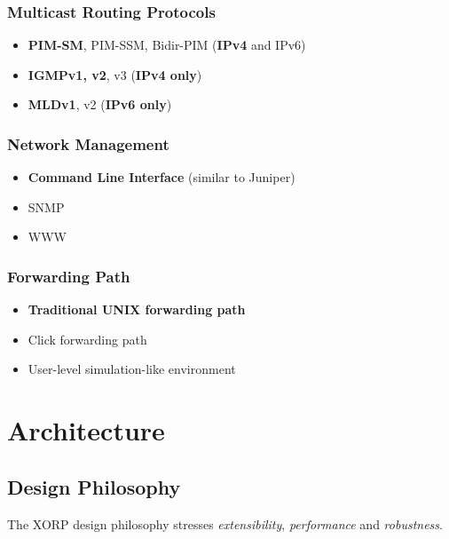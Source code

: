 \documentclass[11pt]{article}
\begin{document}
\subsubsection*{Multicast Routing Protocols}

\begin{itemize}
  \item {\bf PIM-SM}, PIM-SSM, Bidir-PIM ({\bf IPv4} and IPv6)
  \item {\bf IGMPv1, v2}, v3 ({\bf IPv4 only})
  \item {\bf MLDv1}, v2 ({\bf IPv6 only})
\end{itemize}

\subsubsection*{Network Management}

\begin{itemize}
  \item {\bf Command Line Interface} (similar to Juniper)
  \item SNMP
  \item WWW
\end{itemize}

\subsubsection*{Forwarding Path}

\begin{itemize}
  \item {\bf Traditional UNIX forwarding path}
  \item Click forwarding path
  \item User-level simulation-like environment
\end{itemize}

\section{Architecture}

\subsection{Design Philosophy}

The XORP design philosophy stresses {\em extensibility},
{\em performance} and {\em robustness}.
\end{document}
